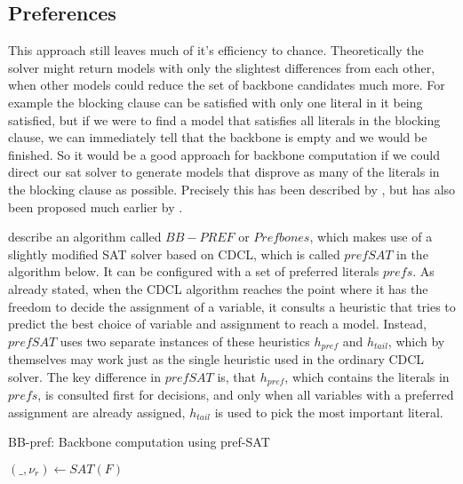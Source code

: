 \subsection{Preferences}
\label{ss:prefs}
This approach still leaves much of it's efficiency to chance. Theoretically the solver might return models with only the slightest differences from each other, when other models could reduce the set of backbone candidates much more. For example the blocking clause can be satisfied with only one literal in it being satisfied, but if we were to find a model that satisfies all literals in the blocking clause, we can immediately tell that the backbone is empty and we would be finished. So it would be a good approach for backbone computation if we could direct our sat solver to generate models that disprove as many of the literals in the blocking clause as possible. Precisely this has been described by \cite{PJ18}, but has also been proposed much earlier by \cite{kk01}. 

\cite{PJ18} describe an algorithm called $BB-PREF$ or $Prefbones$, which makes use of a slightly modified SAT solver based on CDCL, which is called $prefSAT$ in the algorithm below. It can be configured with a set of preferred literals $prefs$. As already stated, when the CDCL algorithm reaches the point where it has the freedom to decide the assignment of a variable, it consults a heuristic that tries to predict the best choice of variable and assignment to reach a model. Instead, $prefSAT$ uses two separate instances of these heuristics $h_{pref}$ and $h_{tail}$, which by themselves may work just as the single heuristic used in the ordinary CDCL solver. The key difference in $prefSAT$ is, that $h_{pref}$, which contains the literals in $prefs$,  is consulted first for decisions, and only when all variables with a preferred assignment are already assigned, $h_{tail}$ is used to pick the most important literal.


\begin{algorithm}
\caption{{\sc BB-pref: Backbone computation using pref-SAT}}
\label{alg:pb0}
\DontPrintSemicolon
{}

$(\_,\nu_r) \gets SAT(F) $\;

\end{algorithm}

